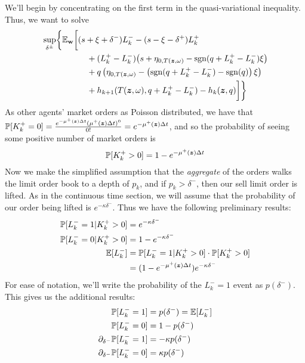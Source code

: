 We'll begin by concentrating on the first term in the quasi-variational inequality. Thus, we want to solve
\begin{equation}
\label{eq:discretesup1}
\begin{split}
& \sup_{\delta^\pm} \biggl\lbrace \E_{\bw} \biggl[
(s + \xi + \delta^-)L_k^- - (s - \xi - \delta^+)L_k^+ \\
& \hphantom{\sup_{\bu} \biggl\lbrace \E_{\bw} \biggl[ {}+{}} + (L_k^+ - L_k^-) \bigl( s + \eta_{0,T(\bz, \omega)}  -\sgn( q + L_k^+ - L_k^-)\xi   \bigr) \\
& \hphantom{\sup_{\bu} \biggl\lbrace \E_{\bw} \biggl[ {}+{}} + q\left( \eta_{0,T(\bz, \omega)}  -\left( \sgn( q + L_k^+ - L_k^-) - \sgn(q) \right) \xi \right) \\
& \hphantom{\sup_{\bu} \biggl\lbrace \E_{\bw} \biggl[ {}+{}} + h_{k+1}(T(\bz,\omega), q + L_k^+ - L_k^- ) -  h_k(\bz,q) \biggr] \biggr\rbrace
\end{split}
\end{equation}
As other agents' market orders as Poisson distributed, we have that $\mathbb{P} [ K_k^+ = 0] = \frac{e^{-\mu^+ (\bm{z}) \Delta t} (\mu^+ (\bm{z}) \Delta t)^0}{0!} = e^{-\mu^+ (\bm{z}) \Delta t}$, and so the probability of seeing some positive number of market orders is
\begin{equation}
\label{eq:discretepositiveKplus}
\mathbb{P} [ K_k^+ > 0] = 1 - e^{-\mu^+ (\bm{z}) \Delta t}
\end{equation}
Now we make the simplified assumption that the \textit{aggregate} of the orders walks the limit order book to a depth of $p_k$, and if $p_k > \delta^-$, then our sell limit order is lifted. As in the continuous time section, we will assume that the probability of our order being lifted is $e^{-\kappa \delta^-}$. Thus we have the following preliminary results:
\begin{align}
\mathbb{P} [ L_k^- = 1 | K_k^+ > 0] & = e^{-\kappa \delta^-} \\
\mathbb{P} [ L_k^- = 0 | K_k^+ > 0] & = 1 - e^{-\kappa \delta^-} \\
\mathbb{E} [ L_k^- ] & = \mathbb{P} [ L_k^- = 1 | K_k^+ > 0] \cdot \mathbb{P}[K_k^+ > 0] \\
& = ( 1 - e^{-\mu^+ (\bm{z}) \Delta t} ) e^{-\kappa \delta^-}
\end{align}
For ease of notation, we'll write the probability of the $L_k^- = 1$ event as $p(\delta^-)$. This gives us the additional results:
\begin{align}
\mathbb{P} [ L_k^- = 1] & = p(\delta^-) = \mathbb{E} [ L_k^-] \\
\mathbb{P} [ L_k^- = 0] & = 1 - p(\delta^-) \\
\partial_{\delta^-} \mathbb{P} [ L_k^- = 1]  & = -\kappa p(\delta^-) \\
\partial_{\delta^-} \mathbb{P} [ L_k^- = 0] & = \kappa p(\delta^-)
\end{align}
